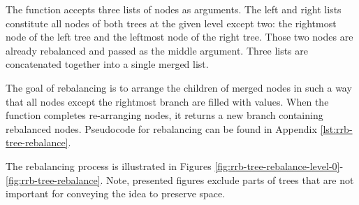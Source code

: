 The  function accepts three lists of nodes as arguments. The left and right lists constitute all nodes of both trees at the given level except two: the rightmost node of the left tree and the leftmost node of the right tree. Those two nodes are already rebalanced and passed as the middle argument. Three lists are concatenated together into a single merged list.

The goal of rebalancing is to arrange the children of merged nodes in such a way that all nodes except the rightmost branch are filled with values. When the  function completes re-arranging nodes, it returns a new branch containing rebalanced nodes. Pseudocode for rebalancing can be found in Appendix \ref{lst:rrb-tree-rebalance}.

The rebalancing process is illustrated in Figures \ref{fig:rrb-tree-rebalance-level-0}-\ref{fig:rrb-tree-rebalance}. Note, presented figures exclude parts of trees that are not important for conveying the idea to preserve space.

